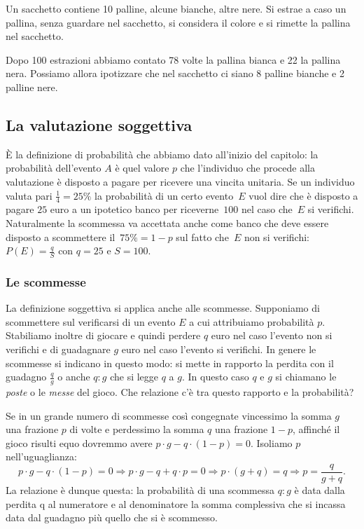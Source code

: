 \begin{esempio}
Un sacchetto contiene 10 palline, alcune bianche, altre nere. Si estrae a 
caso un pallina, senza guardare nel sacchetto, si considera il colore e si 
rimette la pallina nel sacchetto.

Dopo 100 estrazioni abbiamo contato 78 volte la pallina bianca e 22 la 
pallina nera. Possiamo allora ipotizzare che nel sacchetto ci siano 8 
palline bianche e 2 palline nere.
\end{esempio}

\subsection{La valutazione soggettiva}

È la definizione di probabilità che abbiamo dato all'inizio del capitolo: 
la probabilità dell'evento \(A\) è quel valore \(p\) che l'individuo che 
procede alla valutazione è disposto a pagare per ricevere una vincita 
unitaria. 
Se un individuo valuta pari \(\frac 1 4=25\%\) la probabilità di un certo 
evento~\(E\) vuol dire che è disposto a pagare \(25\) euro a un ipotetico banco 
per riceverne~\(100\) nel caso che~\(E\) si verifichi. Naturalmente la 
scommessa va accettata anche come banco che deve essere disposto a 
scommettere il~\(75\%=1-p\) sul fatto che~\(E\) non si 
verifichi: \(P(E)=\frac q S\) con \( q=25 \) e \(S=100\).

\subsubsection*{Le scommesse}

La definizione soggettiva si applica anche alle scommesse. Supponiamo di 
scommettere sul verificarsi di un evento \(E\) a cui attribuiamo probabilità 
\(p\). 
Stabiliamo inoltre di giocare e quindi perdere \(q\) euro nel caso l'evento 
non 
si 
verifichi e di guadagnare \(g\) euro nel caso l'evento si verifichi. In 
genere le 
scommesse si indicano in questo modo: si mette in rapporto la perdita con 
il 
guadagno \(\frac q g\) o anche \(q:g\) che si legge \(q\) a \(g\). In questo caso 
\(q\) e 
\(g\) si chiamano le \emph{poste} o le \emph{messe} del gioco.
Che relazione c'è tra questo rapporto e la probabilità?

Se in un grande numero di scommesse così congegnate vincessimo la somma \(g\) 
una 
frazione \(p\) di volte e perdessimo la somma \(q\) una frazione \(1-p\), 
affinché il 
gioco risulti equo dovremmo avere \(p\cdot g-q\cdot (1-p)=0\). Isoliamo \(p\) 
nell'uguaglianza:
\begin{equation*}
p\cdot g-q\cdot (1-p)=0 \Rightarrow p\cdot g-q+q\cdot p=0\Rightarrow p\cdot 
(g+q)=q \Rightarrow p=\frac q{g+q}.
\end{equation*}
La relazione è dunque questa: la probabilità di una scommessa \(q:g\) è data 
dalla 
perdita q al numeratore e al denominatore la somma complessiva che si 
incassa 
data dal guadagno più quello che si è scommesso.


